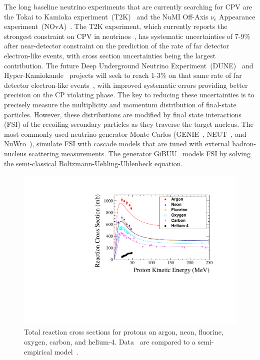 The long baseline neutrino experiments that are currently searching for CPV are the Tokai to Kamioka experiment~(T2K)~\cite{Abe:2019vii} and the NuMI Off-Axis $\nu_{e}$ Appearance experiment~(NOvA)~\cite{Acero:2019ksn}.
The T2K experiment, which currently reports the strongest constraint on CPV in neutrinos~\cite{Abe:2019vii}, has systematic uncertainties of 7-9\% after near-detector constraint on the prediction of the rate of far detector electron-like events, with cross section uncertainties being the largest contribution.
The future Deep Underground Neutrino Experiment~(DUNE)~\cite{abi2020deep} and Hyper-Kamiokande~\cite{abe2011letter} projects will seek to reach 1-3\% on that same rate of far detector electron-like events~\cite{acciarri2016long}, with improved systematic errors providing better precision on the CP violating phase.
The key to reducing these uncertainties is to precisely measure the multiplicity and momentum distribution of final-state particles. 
However, these distributions are modified by final state interactions (FSI) of the recoiling secondary particles as they traverse the target nucleus. 
The most commonly used neutrino generator Monte Carlos (GENIE~\cite{Andreopoulos:2009rq}, NEUT~\cite{Hayato:2009zz}, and NuWro~\cite{GOLAN2012499}), simulate FSI with cascade models that are tuned with external hadron-nucleus scattering measurements. The generator GiBUU~\cite{lalakulich2013neutrino} models FSI by solving the semi-classical Boltzmann-Uehling-Uhlenbeck equation.

\begin{figure}%
    \centering
    \includegraphics[width=12cm]{files/Figures/DataProtonCrossSections.pdf}%
    \caption{Total reaction cross sections for protons on argon, neon, fluorine, oxygen, carbon, and helium-4. Data~\cite{Carlson:1996ofz} are compared to a semi-empirical model~\cite{wellisch1996total}.}
    \label{fig:DataProtonXSec}%
\end{figure}

